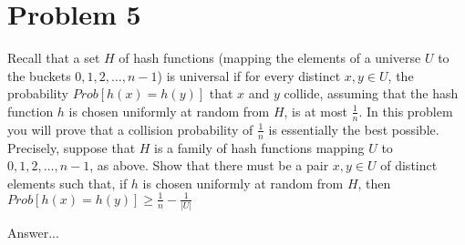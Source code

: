 \documentclass[10pt]{article}
\begin{document}
\section*{\normalsize Problem 5}

Recall that a set $H$ of hash functions (mapping the elements of a universe $U$ to the buckets ${0,1,2,\dots,n-1}$) is universal if for every distinct $x,y \in U$, the probability $Prob[h(x) = h(y)]$ that $x$ and $y$ collide, assuming that the hash function $h$ is chosen uniformly at random from $H$, is at most $\frac{1}{n}$. In this problem you will prove that a collision probability of $\frac{1}{n}$ is essentially the best possible. Precisely, suppose that $H$ is a family of hash functions mapping $U$ to ${0,1,2,\dots,n-1}$, as above. Show that there must be a pair $x,y \in U$ of distinct elements such that, if $h$ is chosen uniformly at random from $H$, then $Prob[h(x) = h(y)] \geq \frac{1}{n} - \frac{1}{|U|}$
\bigskip

Answer...
\end{document}
